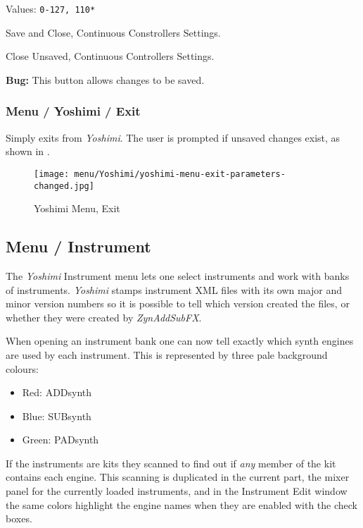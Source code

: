    Values: \texttt{0-127, 110*}

   Save and Close, Continuous Constrollers Settings.

   Close Unsaved, Continuous Controllers Settings.

   \textbf{Bug:}
   This button allows changes to be saved.

\subsubsection{Menu / Yoshimi / Exit}
\label{subsubsec:menu_yoshimi_exit}

   Simply exits from \textsl{Yoshimi}.
   The user is prompted if unsaved changes exist, as shown in
   .

\begin{figure}[H]
   \centering 
   \texttt{[image: menu/Yoshimi/yoshimi-menu-exit-parameters-changed.jpg]}
   \caption[Yoshimi Menu, Exit]{Yoshimi Menu, Exit}
   \label{fig:yoshimi_change_exit}
\end{figure}

\subsection{Menu / Instrument}
\label{subsec:menu_instrument}

   The \textsl{Yoshimi} Instrument menu lets one select instruments and work
   with banks of instruments.
   \textsl{Yoshimi} stamps instrument XML files with its own major and minor
   version numbers so it is possible to tell which version created the files,
   or whether they were created by \textsl{ZynAddSubFX}.

   When opening an instrument bank one can now tell exactly which synth engines
   are used by each instrument. This is represented by three pale background
   colours:

   \begin{itemize}
      \item Red: ADDsynth
      \item Blue: SUBsynth
      \item Green: PADsynth
   \end{itemize}

   If the instruments are kits they scanned to find out if 
   \textsl{any} member of the kit contains each engine.
   This scanning is duplicated in the current part, the mixer panel for the
   currently loaded instruments, and in the Instrument Edit window the same
   colors highlight the engine names when they are enabled with the check
   boxes. 

